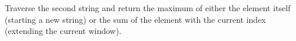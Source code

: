 \documentclass[preview]{standalone}
\begin{document}
Traverse the second string and return the maximum of either the element itself (starting a new string) or the sum of the element with the current index (extending the current window).\\
\end{document}
